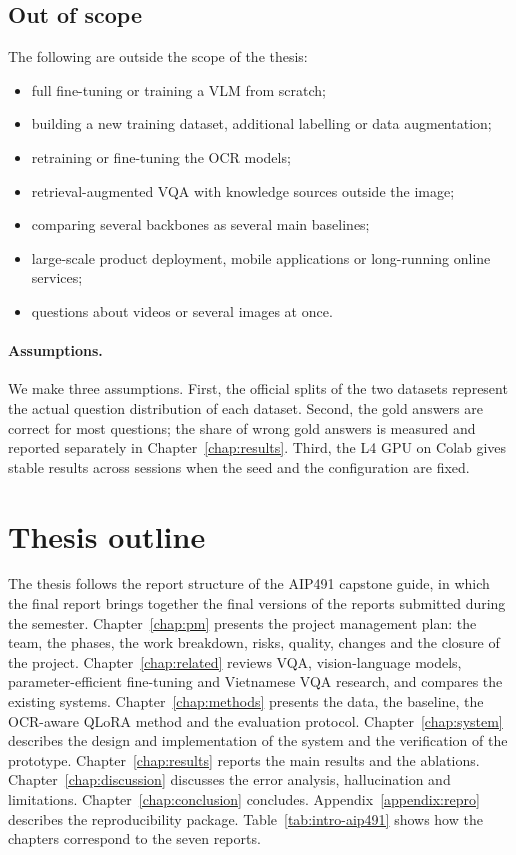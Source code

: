 \subsection{Out of scope}

The following are outside the scope of the thesis:

\begin{itemize}
  \item full fine-tuning or training a VLM from scratch;
  \item building a new training dataset, additional labelling or data augmentation;
  \item retraining or fine-tuning the OCR models;
  \item retrieval-augmented VQA with knowledge sources outside the image;
  \item comparing several backbones as several main baselines;
  \item large-scale product deployment, mobile applications or long-running online
  services;
  \item questions about videos or several images at once.
\end{itemize}

\paragraph{Assumptions.} We make three assumptions. First, the official splits of the two
datasets represent the actual question distribution of each dataset. Second, the gold
answers are correct for most questions; the share of wrong gold answers is measured and
reported separately in Chapter~\ref{chap:results}. Third, the L4 GPU on Colab gives
stable results across sessions when the seed and the configuration are fixed.

\section{Thesis outline}
\label{sec:intro-outline}

The thesis follows the report structure of the AIP491 capstone guide, in which the final
report brings together the final versions of the reports submitted during the semester.
Chapter~\ref{chap:pm} presents the project management plan: the team, the phases, the work
breakdown, risks, quality, changes and the closure of the project. Chapter~\ref{chap:related}
reviews VQA, vision-language models, parameter-efficient fine-tuning and Vietnamese VQA
research, and compares the existing systems. Chapter~\ref{chap:methods} presents the data,
the baseline, the OCR-aware QLoRA method and the evaluation protocol.
Chapter~\ref{chap:system} describes the design and implementation of the system and the
verification of the prototype. Chapter~\ref{chap:results} reports the main results and the
ablations. Chapter~\ref{chap:discussion} discusses the error analysis, hallucination and
limitations. Chapter~\ref{chap:conclusion} concludes. Appendix~\ref{appendix:repro}
describes the reproducibility package. Table~\ref{tab:intro-aip491} shows how the chapters
correspond to the seven reports.

